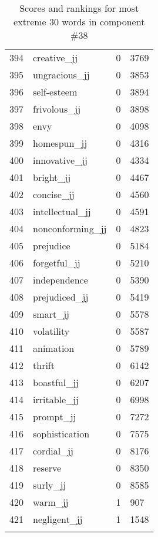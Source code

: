 \begin{longtable}[!htbp]{| rlr@{.}l |}
    394 & creative\_jj & 0 & 3769 \\
    395 & ungracious\_jj & 0 & 3853 \\
    396 & self-esteem & 0 & 3894 \\
    397 & frivolous\_jj & 0 & 3898 \\
    398 & envy & 0 & 4098 \\
    399 & homespun\_jj & 0 & 4316 \\
    400 & innovative\_jj & 0 & 4334 \\
    401 & bright\_jj & 0 & 4467 \\
    402 & concise\_jj & 0 & 4560 \\
    403 & intellectual\_jj & 0 & 4591 \\
    404 & nonconforming\_jj & 0 & 4823 \\
    405 & prejudice & 0 & 5184 \\
    406 & forgetful\_jj & 0 & 5210 \\
    407 & independence & 0 & 5390 \\
    408 & prejudiced\_jj & 0 & 5419 \\
    409 & smart\_jj & 0 & 5578 \\
    410 & volatility & 0 & 5587 \\
    411 & animation & 0 & 5789 \\
    412 & thrift & 0 & 6142 \\
    413 & boastful\_jj & 0 & 6207 \\
    414 & irritable\_jj & 0 & 6998 \\
    415 & prompt\_jj & 0 & 7272 \\
    416 & sophistication & 0 & 7575 \\
    417 & cordial\_jj & 0 & 8176 \\
    418 & reserve & 0 & 8350 \\
    419 & surly\_jj & 0 & 8585 \\
    420 & warm\_jj & 1 & 907 \\
    421 & negligent\_jj & 1 & 1548 \\
    \hline
    \caption{Scores and rankings for most extreme 30 words in component \#38} \\
\end{longtable}
